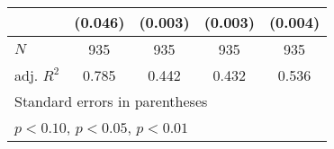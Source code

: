 {\begin{tabular}{l*{4}{c}}
            &     (0.046)         &     (0.003)         &     (0.003)         &     (0.004)         \\
\hline
\(N\)       &         935         &         935         &         935         &         935         \\
adj. \(R^{2}\)&       0.785         &       0.442         &       0.432         &       0.536         \\
\hline\hline
\multicolumn{5}{l}{\footnotesize Standard errors in parentheses}\\
\multicolumn{5}{l}{\footnotesize \sym{*} \(p<0.10\), \sym{**} \(p<0.05\), \sym{***} \(p<0.01\)}\\
\end{tabular}
}
